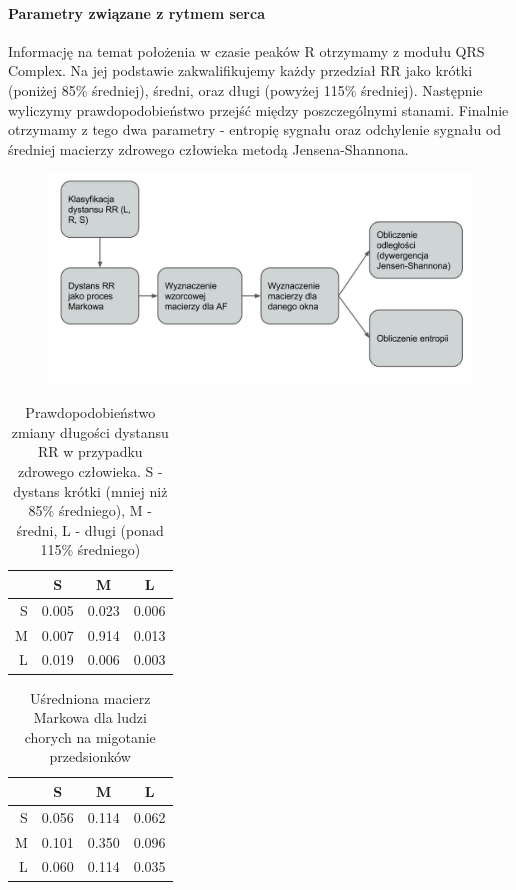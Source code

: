 \paragraph{Parametry związane z rytmem serca}
Informację na temat położenia w czasie peaków R otrzymamy z modułu QRS Complex. 
Na jej podstawie zakwalifikujemy każdy przedział RR jako krótki (poniżej 85\% średniej), 
średni, oraz długi (powyżej 115\% średniej). 
Następnie wyliczymy prawdopodobieństwo przejść między poszczególnymi stanami. 
Finalnie otrzymamy z tego dwa parametry - 
entropię sygnału oraz odchylenie sygnału od średniej macierzy zdrowego człowieka metodą Jensena-Shannona.
\begin{figure}[ht]
\centering
\includegraphics[width=12cm]{ATRIAL_FIBR/img/RRMethodFlow.jpg}
\end{figure}

\begin{table}[!ht]
  \centering
  \begin{tabular}{|r|ccc|}
    \hline 
    & S & M & L \\
    \hline
    S & 0.005 & 0.023 & 0.006 \\
    M & 0.007 & 0.914 & 0.013 \\
    L & 0.019 & 0.006 & 0.003 \\
    \hline
  \end{tabular}
  \caption[Macierz Markowa - zdrowy człowiek]
          {Prawdopodobieństwo zmiany długości dystansu RR w przypadku zdrowego człowieka. 
            S - dystans krótki (mniej niż 85\% średniego), 
            M - średni, L - długi (ponad 115\% średniego)}
\end{table}

\begin{table}[!ht]
  \centering
  \begin{tabular}{|r|ccc|}
    \hline 
    & S & M & L \\
    \hline
    S & 0.056 & 0.114 & 0.062 \\
    M & 0.101 & 0.350 & 0.096 \\
    L & 0.060 & 0.114 & 0.035 \\
    \hline
  \end{tabular}
  \caption[Macierz Markowa - chory człowiek]{Uśredniona macierz Markowa dla ludzi chorych na migotanie przedsionków}
\end{table}

